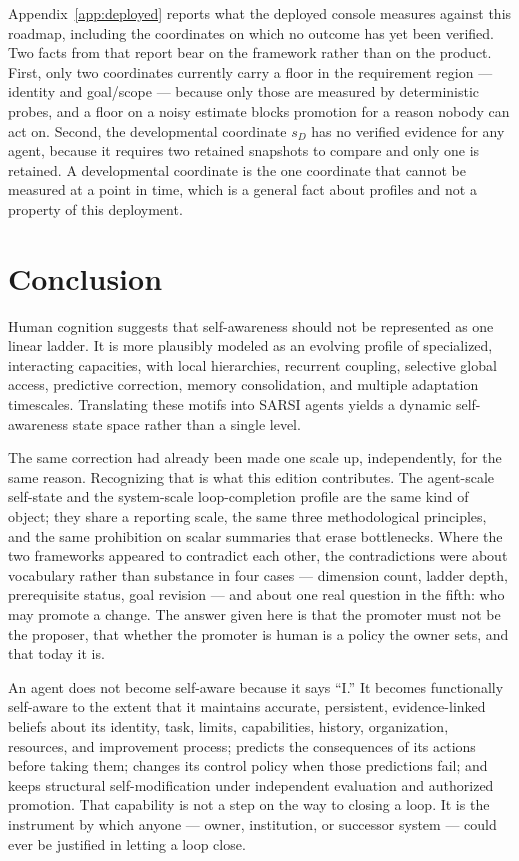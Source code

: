 \documentclass[11pt]{article}
\begin{document}
Appendix~\ref{app:deployed} reports what the deployed console measures against this roadmap, including the coordinates on which no outcome has yet been verified. Two facts from that report bear on the framework rather than on the product. First, only two coordinates currently carry a floor in the requirement region --- identity and goal/scope --- because only those are measured by deterministic probes, and a floor on a noisy estimate blocks promotion for a reason nobody can act on. Second, the developmental coordinate $s_D$ has no verified evidence for any agent, because it requires two retained snapshots to compare and only one is retained. A developmental coordinate is the one coordinate that cannot be measured at a point in time, which is a general fact about profiles and not a property of this deployment.

\section{Conclusion}
\label{sec:conclusion}

Human cognition suggests that self-awareness should not be represented as one linear ladder. It is more plausibly modeled as an evolving profile of specialized, interacting capacities, with local hierarchies, recurrent coupling, selective global access, predictive correction, memory consolidation, and multiple adaptation timescales. Translating these motifs into SARSI agents yields a dynamic self-awareness state space rather than a single level.

The same correction had already been made one scale up, independently, for the same reason. Recognizing that is what this edition contributes. The agent-scale self-state and the system-scale loop-completion profile are the same kind of object; they share a reporting scale, the same three methodological principles, and the same prohibition on scalar summaries that erase bottlenecks. Where the two frameworks appeared to contradict each other, the contradictions were about vocabulary rather than substance in four cases --- dimension count, ladder depth, prerequisite status, goal revision --- and about one real question in the fifth: who may promote a change. The answer given here is that the promoter must not be the proposer, that whether the promoter is human is a policy the owner sets, and that today it is.

An agent does not become self-aware because it says ``I.'' It becomes functionally self-aware to the extent that it maintains accurate, persistent, evidence-linked beliefs about its identity, task, limits, capabilities, history, organization, resources, and improvement process; predicts the consequences of its actions before taking them; changes its control policy when those predictions fail; and keeps structural self-modification under independent evaluation and authorized promotion. That capability is not a step on the way to closing a loop. It is the instrument by which anyone --- owner, institution, or successor system --- could ever be justified in letting a loop close.
\end{document}
